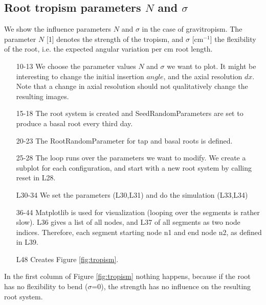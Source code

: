 \subsection{Root tropism parameters $N$ and $\sigma$}

We show the influence parameters $N$ and $\sigma$ in the case of gravitropism. The parameter $N$ [1] denotes the strength of the tropism, and $\sigma$ [cm$^{-1}$] the flexibility of the root, i.e. the expected angular variation per cm root length. 



\begin{itemize}
\item[10-13] We choose the parameter values $N$ and $\sigma$ we want to plot. It might be interesting to change the initial insertion $angle$, and the axial resolution $dx$. Note that a change in axial resolution should not qualitatively change the resulting images.

\item[15-18] The root system is created and SeedRandomParameters are set to produce a basal root every third day. 

\item[20-23] The RootRandomParameter for tap and basal roots is defined.

\item[25-28] The loop runs over the parameters we want to modify. We create a subplot for each configuration, and start with a new root system by calling reset in L28.

\item[L30-34] We set the parameters (L30,L31) and do the simulation (L33,L34)

\item[36-44] Matplotlib is used for visualization (looping over the segments is rather slow). L36 gives a list of all nodes, and L37 of all segments as two node indices. Therefore, each segment starting node n1 and end node n2, as defined in L39.

\item[L48] Creates Figure \ref{fig:tropism}.

\end{itemize}

In the first column of Figure \ref{fig:tropism} nothing happens, because if the root has no flexibility to bend ($\sigma$=0), the strength has no influence on the resulting root system. 

